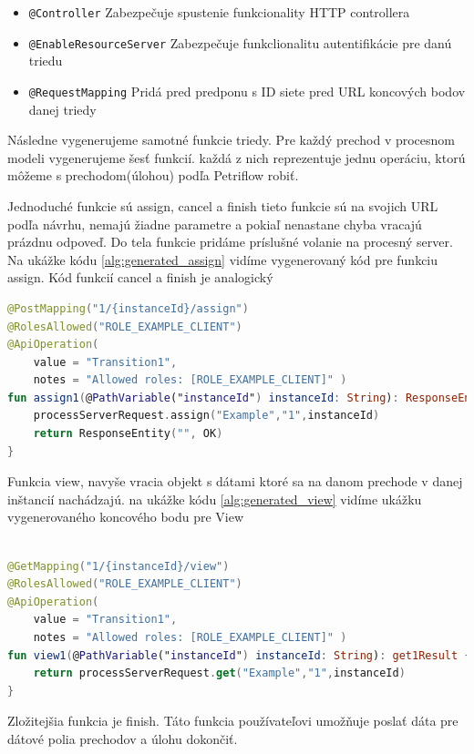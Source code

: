 \begin{itemize}
\item \texttt{@Controller} Zabezpečuje spustenie funkcionality HTTP controllera
\item \texttt{@EnableResourceServer} Zabezpečuje funkclionalitu autentifikácie pre danú triedu
\item \texttt{@RequestMapping} Pridá pred predponu s ID siete pred URL koncových bodov danej triedy
\end{itemize}

Následne vygenerujeme samotné funkcie triedy. Pre každý prechod v procesnom modeli vygenerujeme šesť funkcií. každá z nich reprezentuje jednu operáciu, ktorú môžeme s prechodom(úlohou) podľa Petriflow robiť.

Jednoduché funkcie sú assign, cancel a finish tieto funkcie sú na svojich URL podľa návrhu, nemajú žiadne parametre a pokiaľ nenastane chyba vracajú prázdnu odpoveď. Do tela funkcie pridáme príslušné volanie na procesný server. Na ukážke kódu \ref{alg:generated_assign} vidíme vygenerovaný kód pre funkciu assign. Kód funkcií cancel a finish je analogický

\begin{lstlisting}[float, caption={Príklad vygenerovanej funkcie},label={alg:generated_assign},language=Kotlin]
@PostMapping("1/{instanceId}/assign")
@RolesAllowed("ROLE_EXAMPLE_CLIENT")
@ApiOperation(
	value = "Transition1",
	notes = "Allowed roles: [ROLE_EXAMPLE_CLIENT]" )
fun assign1(@PathVariable("instanceId") instanceId: String): ResponseEntity<String> {
	processServerRequest.assign("Example","1",instanceId)
	return ResponseEntity("", OK)
}
\end{lstlisting}

Funkcia view, navyše vracia objekt s dátami ktoré sa na danom prechode v danej inštancií nachádzajú. na ukážke kódu \ref{alg:generated_view} vidíme ukážku vygenerovaného koncového bodu pre View

\begin{lstlisting}[float, caption={Príklad vygenerovanej funkcie},label={alg:generated_view},language=Kotlin]

@GetMapping("1/{instanceId}/view")
@RolesAllowed("ROLE_EXAMPLE_CLIENT")
@ApiOperation(
	value = "Transition1",
	notes = "Allowed roles: [ROLE_EXAMPLE_CLIENT]" )
fun view1(@PathVariable("instanceId") instanceId: String): get1Result {
	return processServerRequest.get("Example","1",instanceId)
}
\end{lstlisting}


Zložitejšia funkcia je finish. Táto funkcia používateľovi umožňuje poslať dáta pre dátové polia prechodov a úlohu dokončiť.

